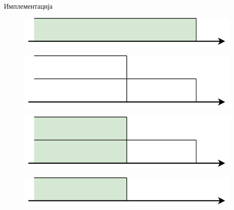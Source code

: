 \documentclass[xcolor=table]{beamer}
\begin{document}
\begin{frame}[allowframebreaks]{Имплементација}
        \framebreak
        
        \begin{figure}
            \centering
            \includegraphics[width=\textwidth,height=0.8\textheight,keepaspectratio]{images/uni_int12.png}
        \end{figure}
        
        \framebreak
        
        \begin{figure}
            \centering
            \includegraphics[width=\textwidth,height=0.8\textheight,keepaspectratio]{images/uni_int13.png}
        \end{figure}
        
        \framebreak
        
        \begin{figure}
            \centering
            \includegraphics[width=\textwidth,height=0.8\textheight,keepaspectratio]{images/uni_int14.png}
        \end{figure}
        
        \framebreak
        
        \begin{figure}
            \centering
            \includegraphics[width=\textwidth,height=0.8\textheight,keepaspectratio]{images/uni_int15.png}
        \end{figure}
        

\end{frame}
\end{document}
